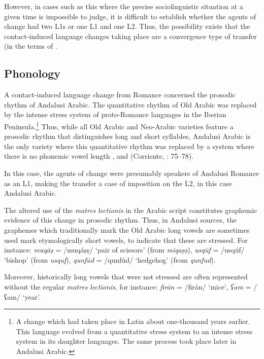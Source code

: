 \documentclass[output=paper,modfonts,nonflat]{langsci/langscibook}
\begin{document}
However, in cases such as this where the precise sociolinguistic situation at a given time is impossible to judge, it is difficult to establish whether the agents of change had two L1s or one L1 and one L2. Thus, the possibility exists that the contact-induced language changes taking place are a convergence type of transfer (in the terms of \citep{Lucas2015}. 




\subsection{\label{bkm:Ref12959774}Phonology}




A contact-induced language change from Romance concerned the prosodic rhythm of Andalusi Arabic. The quantitative rhythm of Old Arabic was replaced by the intense stress system of proto-Romance languages in the Iberian Peninsula.\footnote{A change which had taken place in Latin about one-thousand years earlier. This language evolved from a quantitative stress system to an intense stress system in its daughter languages. The same process took place later in Andalusi Arabic.} Thus, while all Old Arabic and Neo-Arabic varieties feature a prosodic rhythm that distinguishes long and short syllables, Andalusi Arabic is the only variety where this quantitative rhythm was replaced by a system where there is no phonemic vowel length \citep{Corriente1977}, \citep{Corriente1992} and (Corriente, \citealt{PereiraVicente2015}: 75–78).

In this case, the agents of change were presumably speakers of Andalusi Romance as an L1, making the transfer a case of imposition on the L2, in this case Andalusi Arabic. 

The altered use of the \textit{matres} \textit{lectionis} in the Arabic script constitutes graphemic evidence of this change in prosodic rhythm. Thus, in Andalusi sources, the graphemes which traditionally mark the Old Arabic long vowels are sometimes used mark etymologically short vowels, to indicate that these are stressed. For instance: {} \textit{{muqāṣ}} = /muqáṣṣ/ ‘pair of scissors’ (from \textit{miqaṣṣ}), {} \textit{usqūf} = /usqúf/ ‘bishop’ (from \textit{usquf}), {} \textit{qunfūd} = /qunfúd/ ‘hedgehog’ (from \textit{qunfud}).  

Moreover, historically long vowels that were not stressed are often represented without the regular \textit{matres} \textit{lectionis}, for instance: {} \textit{firān} = /firán/ ‘mice’, {} \textit{ʕam} = /ʕam/ ‘year’.
\end{document}
